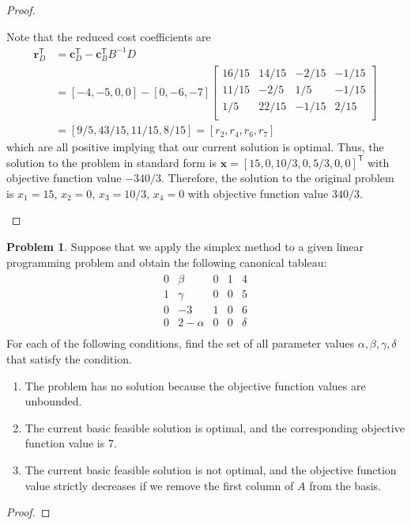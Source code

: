 \documentclass[12pt]{article}
\theoremstyle{definition}
\newtheorem{problem}{Problem}
\newcommand{\vect}[1]{\boldsymbol{#1}}
\newcommand{\tran}{\mathsf{T}}
\begin{document}
\begin{proof}
\begin{enumerate}
      Note that the reduced cost coefficients are
      \begin{align*}
        \vect{r}_D^\tran &= \vect{c}_D^\tran - \vect{c}_B^\tran B^{-1} D \\
        &= [-4, -5, 0, 0] - [0, -6, -7]
        \begin{bmatrix}
          16/15 & 14/15 & -2/15 & -1/15 \\
          11/15 & -2/5 & 1/5 & -1/15 \\
          1/5 & 22/15 & -1/15 & 2/15 \\
        \end{bmatrix} \\
        &= [9/5, 43/15, 11/15, 8/15] = [r_2, r_4, r_6, r_7]
      \end{align*}
      which are all positive implying that our current solution is optimal.
      Thus, the solution to the problem in standard form is $\vect{x} = [15,0,10/3,0,5/3,0,0]^\tran$
      with objective function value $-340/3$. Therefore, the solution to the original problem
      is $x_1 = 15$, $x_2 = 0$, $x_3=10/3$, $x_4=0$ with objective function value $340/3$.
  \end{enumerate}
\end{proof}
\newpage


\begin{problem}
  Suppose that we apply the simplex method to a given linear programming
  problem and obtain the following canonical tableau:
  \begin{align*}
    \begin{matrix}
      0 & \beta & 0 & 1 & 4 \\
      1 & \gamma & 0 & 0 & 5 \\
      0 & -3 & 1 & 0 & 6 \\
      0 & 2 - \alpha & 0 & 0 & \delta \\
    \end{matrix}
  \end{align*}
  For each of the following conditions, find the set of all parameter values
  $\alpha, \beta, \gamma, \delta$ that satisfy the condition.
  \begin{enumerate}
    \item The problem has no solution because the objective function values are
      unbounded.
    \item The current basic feasible solution is optimal, and the corresponding
      objective function value is 7.
    \item The current basic feasible solution is not optimal, and the objective
      function value strictly decreases if we remove the first column of $A$ from
      the basis.
  \end{enumerate}
\end{problem}

\begin{proof}
\end{proof}
\end{document}

